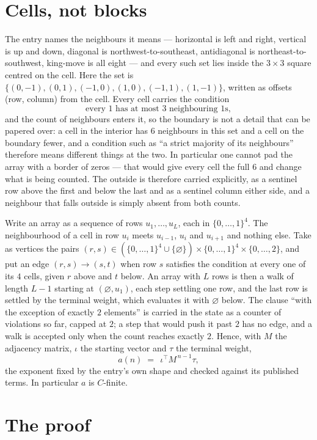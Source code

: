 \documentclass[11pt,a4paper]{article}
\theoremstyle{plain}
\theoremstyle{definition}
\begin{document}
\section{Cells, not blocks}

The entry names the neighbours it means --- horizontal is left and right, vertical is up and
down, diagonal is northwest-to-southeast, antidiagonal is northeast-to-southwest, king-move is
all eight --- and every such set lies inside the $3\times3$ square centred on the cell. Here
the set is $\{(0,-1), (0,1), (-1,0), (1,0), (-1,1), (1,-1)\}$, written as offsets (row, column) from the cell. Every cell carries
the condition
\[
\text{every 1 has at most 3 neighbouring 1s},
\]
and the count of neighbours enters it, so the boundary is not a detail that can be papered
over: a cell in the interior has $6$ neighbours in this set and a cell on the boundary
fewer, and a condition such as ``a strict majority of its neighbours'' therefore means
different things at the two. In particular one cannot pad the array with a border of zeros ---
that would give every cell the full $6$ and change what is being counted. The outside is
therefore carried
explicitly, as a sentinel row above the first and below the last and as a sentinel column
either side, and a neighbour that falls outside is simply absent from both counts.

Write an array as a sequence of rows $u_1,\dots,u_L$, each in
$\{0,\dots,1\}^{4}$. The neighbourhood of a cell in row $u_i$ meets $u_{i-1}$,
$u_i$ and $u_{i+1}$ and nothing else. Take as vertices the pairs
$(r,s)\in(\{0,\dots,1\}^{4}\cup\{\varnothing\})\times\{0,\dots,1\}^{4} \times \{0,\dots,2\}$,
and put an edge $(r,s)\to(s,t)$ when row $s$ satisfies the condition at every one of its
$4$ cells, given $r$ above and $t$ below. An array with $L$ rows is then a walk of length
$L-1$ starting at $(\varnothing,u_1)$, each step settling one row, and the last row is
settled by the terminal weight, which evaluates it with $\varnothing$ below. The clause ``with the exception of exactly $2$ elements'' is carried in
the state as a counter of violations so far, capped at $2$; a step that would push it past
$2$ has no edge, and a walk is accepted only when the count reaches exactly $2$. Hence,
with $M$ the adjacency matrix, $\iota$ the starting vector and $\tau$ the terminal weight,
\[
a(n)\;=\;\,\iota^{\!\top}M^{\,n-1}\tau ,
\]
the exponent fixed by the entry's own shape and checked against its published terms. In
particular $a$ is $C$-finite.

\section{The proof}
\end{document}
